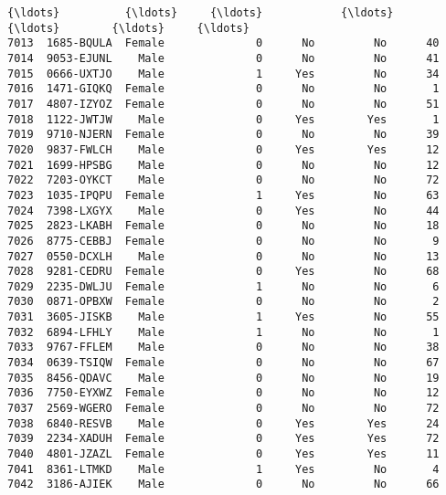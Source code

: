 \documentclass[11pt]{article}
\begin{document}
\begin{tcolorbox}[breakable, boxrule=.5pt, size=fbox, pad at break*=1mm, opacityfill=0]
\begin{Verbatim}[commandchars=\\\{\}]
{\ldots}          {\ldots}     {\ldots}            {\ldots}     {\ldots}        {\ldots}     {\ldots}
7013  1685-BQULA  Female              0      No         No      40
7014  9053-EJUNL    Male              0      No         No      41
7015  0666-UXTJO    Male              1     Yes         No      34
7016  1471-GIQKQ  Female              0      No         No       1
7017  4807-IZYOZ  Female              0      No         No      51
7018  1122-JWTJW    Male              0     Yes        Yes       1
7019  9710-NJERN  Female              0      No         No      39
7020  9837-FWLCH    Male              0     Yes        Yes      12
7021  1699-HPSBG    Male              0      No         No      12
7022  7203-OYKCT    Male              0      No         No      72
7023  1035-IPQPU  Female              1     Yes         No      63
7024  7398-LXGYX    Male              0     Yes         No      44
7025  2823-LKABH  Female              0      No         No      18
7026  8775-CEBBJ  Female              0      No         No       9
7027  0550-DCXLH    Male              0      No         No      13
7028  9281-CEDRU  Female              0     Yes         No      68
7029  2235-DWLJU  Female              1      No         No       6
7030  0871-OPBXW  Female              0      No         No       2
7031  3605-JISKB    Male              1     Yes         No      55
7032  6894-LFHLY    Male              1      No         No       1
7033  9767-FFLEM    Male              0      No         No      38
7034  0639-TSIQW  Female              0      No         No      67
7035  8456-QDAVC    Male              0      No         No      19
7036  7750-EYXWZ  Female              0      No         No      12
7037  2569-WGERO  Female              0      No         No      72
7038  6840-RESVB    Male              0     Yes        Yes      24
7039  2234-XADUH  Female              0     Yes        Yes      72
7040  4801-JZAZL  Female              0     Yes        Yes      11
7041  8361-LTMKD    Male              1     Yes         No       4
7042  3186-AJIEK    Male              0      No         No      66


\end{Verbatim}
\end{tcolorbox}
\end{document}
